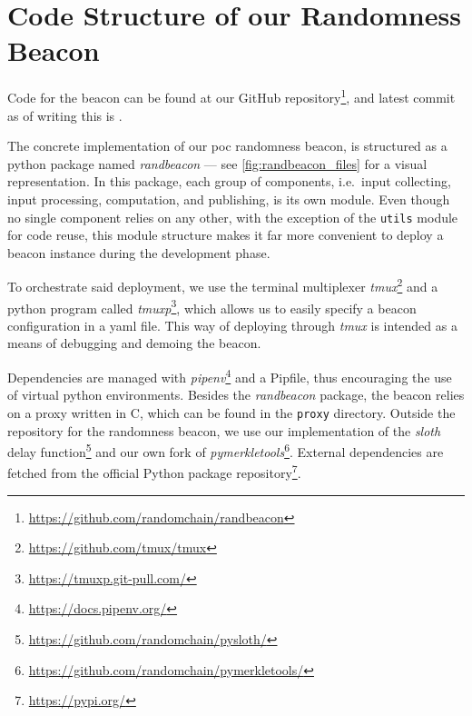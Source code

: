 \section{Code Structure of our Randomness Beacon}%
\label{app:beacon_code}

Code for the beacon can be found at our GitHub repository\footnote{\url{https://github.com/randomchain/randbeacon}}, and latest commit as of writing this is .

\bigskip\noindent
The concrete implementation of our \gls{poc} randomness beacon, is structured as a python package named \textit{randbeacon} --- see \cref{fig:randbeacon_files} for a visual representation.
In this package, each group of components, i.e.\ input collecting, input processing, computation, and publishing, is its own module.
Even though no single component relies on any other, with the exception of the \texttt{utils} module for code reuse, this module structure makes it far more convenient to deploy a beacon instance during the development phase.

To orchestrate said deployment, we use the terminal multiplexer \textit{tmux}\footnote{\url{https://github.com/tmux/tmux}} and a python program called \textit{tmuxp}\footnote{\url{https://tmuxp.git-pull.com/}}, which allows us to easily specify a beacon configuration in a yaml file.
This way of deploying through \textit{tmux} is intended as a means of debugging and demoing the beacon.

Dependencies are managed with \textit{pipenv}\footnote{\url{https://docs.pipenv.org/}} and a Pipfile, thus encouraging the use of virtual python environments.
Besides the \textit{randbeacon} package, the beacon relies on a proxy written in C, which can be found in the \texttt{proxy} directory.
Outside the repository for the randomness beacon, we use our implementation of the \textit{sloth} delay function\footnote{\url{https://github.com/randomchain/pysloth/}} and our own fork of \textit{pymerkletools}\footnote{\url{https://github.com/randomchain/pymerkletools/}}.
External dependencies are fetched from the official Python package repository\footnote{\url{https://pypi.org/}}.



